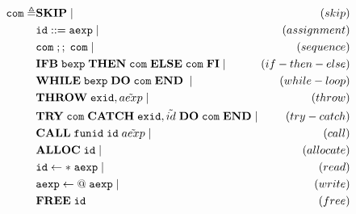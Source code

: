 \begin{equation}
\begin{alignedat}{2}
\verb|com| \triangleq & \textbf{SKIP} \;|\; & (skip) \\&
	\verb|id| ::= \verb|aexp| \;|\; & (assignment) \\&
	\verb|com|\; ;;\; \verb|com| \;|\; & (sequence) \\&
	\textbf{IFB}\; \verb|bexp|\; \textbf{THEN}\; \verb|com|\; \textbf{ELSE}\; \verb|com|\; \textbf{FI} \;|\; & (if-then-else) \\&
	\textbf{WHILE}\; \verb|bexp|\; \textbf{DO}\; \verb|com|\; \textbf{END}\; \;|\; & (while-loop) \\&
	\textbf{THROW}\; \verb|exid|, \tilde{aexp} \;|\; & (throw) \\&
	\textbf{TRY}\; \verb|com|\; \textbf{CATCH}\; \verb|exid|, \tilde{id}\; \textbf{DO}\; \verb|com|\; \textbf{END} \;|\; & (try-catch) \\&
	\textbf{CALL}\; \verb|funid|\; \verb|id|\; \tilde{aexp} \;|\; & (call) \\&
	\textbf{ALLOC}\;\verb|id| \;|\; & (allocate) \\&
	\verb|id|\leftarrow*\;\verb|aexp| \;|\; & (read) \\&
	\verb|aexp|\leftarrow@\;\verb|aexp| \;|\; & (write) \\&
	\textbf{FREE}\;\verb|id| & (free)
\end{alignedat}
\end{equation}
